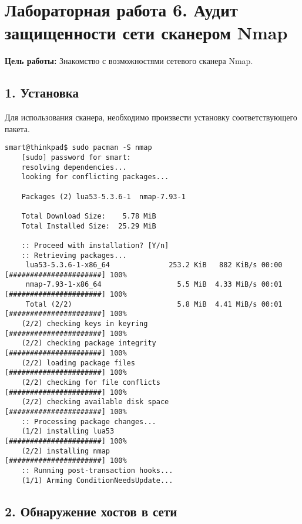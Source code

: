 \chapter*{Лабораторная работа 6. Аудит защищенности сети сканером Nmap}

\textbf{Цель работы:} Знакомство с возможностями сетевого сканера Nmap.

\section*{1. Установка}

Для использования сканера, необходимо произвести установку соответствующего пакета.
\begin{Verbatim}[frame=single]
    smart@thinkpad$ sudo pacman -S nmap
    [sudo] password for smart: 
    resolving dependencies...
    looking for conflicting packages...

    Packages (2) lua53-5.3.6-1  nmap-7.93-1

    Total Download Size:    5.78 MiB
    Total Installed Size:  25.29 MiB

    :: Proceed with installation? [Y/n] 
    :: Retrieving packages...
     lua53-5.3.6-1-x86_64              253.2 KiB   882 KiB/s 00:00 [######################] 100%
     nmap-7.93-1-x86_64                  5.5 MiB  4.33 MiB/s 00:01 [######################] 100%
     Total (2/2)                         5.8 MiB  4.41 MiB/s 00:01 [######################] 100%
    (2/2) checking keys in keyring                                 [######################] 100%
    (2/2) checking package integrity                               [######################] 100%
    (2/2) loading package files                                    [######################] 100%
    (2/2) checking for file conflicts                              [######################] 100%
    (2/2) checking available disk space                            [######################] 100%
    :: Processing package changes...
    (1/2) installing lua53                                         [######################] 100%
    (2/2) installing nmap                                          [######################] 100%
    :: Running post-transaction hooks...
    (1/1) Arming ConditionNeedsUpdate...
\end{Verbatim}

\section*{2. Обнаружение хостов в сети}

